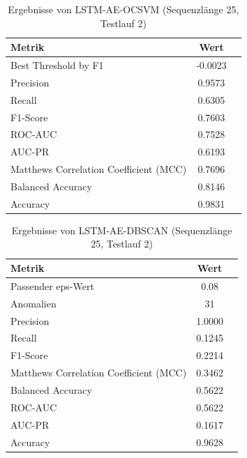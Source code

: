 \documentclass[a4paper,12pt]{article}
\begin{document}
\begin{table}[H]
	\centering
	\caption{Ergebnisse von LSTM-AE-OCSVM (Sequenzlänge 25, Testlauf 2)}
	\begin{tabular}{lcc}
		\hline
		Metrik & Wert \\
		\hline
		Best Threshold by F1 & -0.0023 \\
		Precision & 0.9573 \\
		Recall & 0.6305 \\
		F1-Score & 0.7603 \\
		ROC-AUC & 0.7528 \\
		AUC-PR & 0.6193 \\
		Matthews Correlation Coefficient (MCC) & 0.7696 \\
		Balanced Accuracy & 0.8146 \\
		Accuracy & 0.9831 \\
		\hline
	\end{tabular}
\end{table}

\begin{table}[H]
	\centering
	\caption{Ergebnisse von LSTM-AE-DBSCAN (Sequenzlänge 25, Testlauf 2)}
	\begin{tabular}{lcc}
		\hline
		Metrik & Wert \\
		\hline
		Passender eps-Wert & 0.08 \\
		Anomalien & 31 \\
		Precision & 1.0000 \\
		Recall & 0.1245 \\
		F1-Score & 0.2214 \\
		Matthews Correlation Coefficient (MCC) & 0.3462 \\
		Balanced Accuracy & 0.5622 \\
		ROC-AUC & 0.5622 \\
		AUC-PR & 0.1617 \\
		Accuracy & 0.9628 \\
		\hline
	\end{tabular}
\end{table}
\end{document}
